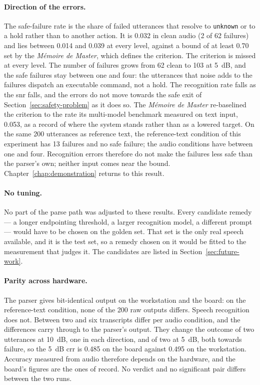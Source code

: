 \paragraph{Direction of the errors.} The safe-failure rate is the share of failed utterances that
resolve to \texttt{unknown} or to a hold rather than to another action. It is 0.032 in clean audio
(2 of 62 failures) and lies between 0.014 and 0.039 at every level, against a bound of at least 0.70
set by the \emph{M\'emoire de Master}, which defines the criterion. The criterion is missed at every
level. The number of failures grows from 62 clean to 103 at 5~dB, and the safe failures stay between
one and four: the utterances that noise adds to the failures dispatch an executable command, not a
hold. The recognition rate falls as the \gls{snr} falls, and the errors do not move towards the safe
exit of Section~\ref{sec:safety-problem} as it does so. The \emph{M\'emoire de Master} re-baselined
the criterion to the rate its multi-model benchmark measured on text input, 0.053, as a record of
where the system stands rather than as a lowered target. On the same 200 utterances as reference
text, the reference-text condition of this experiment has 13 failures and no safe failure; the
audio conditions have between one and four. Recognition errors therefore do not make the failures
less safe than the parser's own; neither input comes near the bound. Chapter~\ref{chap:demonstration}
returns to this result.

\paragraph{No tuning.} No part of the parse path was adjusted to these results. Every candidate
remedy --- a longer endpointing threshold, a larger recognition model, a different prompt --- would
have to be chosen on the golden set. That set is the only real speech available, and it is the test
set, so a remedy chosen on it would be fitted to the measurement that judges it. The candidates are
listed in Section~\ref{sec:future-work}.

\paragraph{Parity across hardware.} The parser gives bit-identical output on the workstation and
the board: on the reference-text condition, none of the 200 raw outputs differs. Speech recognition
does not. Between two and six transcripts differ per audio condition, and the differences carry
through to the parser's output. They change the outcome of two utterances at 10~dB, one in each
direction, and of two at 5~dB, both towards failure, so the 5~dB \gls{crr} is 0.485 on the board
against 0.495 on the workstation. Accuracy measured from audio therefore depends on the hardware,
and the board's figures are the ones of record. No verdict and no significant pair differs between
the two runs.

